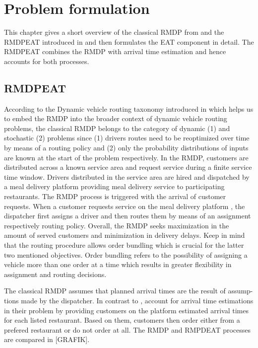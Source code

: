 \chapter{Problem formulation}

This chapter gives a short overview of the classical RMDP from \cite{UlmerRMDP} and the RMDPEAT introduced in \cite{Hildebrandt2020_EAT} and then formulates the EAT component in detail. The RMDPEAT combines the RMDP with arrival time estimation and hence accounts for both processes.

\section{RMDPEAT} 

According to the Dynamic vehicle routing taxonomy introduced in \cite{psaraftis} which helps us to embed the RMDP into the broader context of dynamic vehicle routing problems, the classical RMDP belongs to the category of dynamic (1) and stochastic (2) problems since (1) drivers routes need to be reoptimized over time by means of a routing policy and (2) only the probability distributions of inputs are known at the start of the problem respectively. In the RMDP, customers are distributed across a known service area and request service during a finite service time window. Drivers distributed in the service area are hired and dispatched by a meal delivery platform providing meal delivery service to participating restaurants. The RMDP process is triggered with the arrival of customer requests. When a customer requests service on the meal delivery platform , the dispatcher first assigns a driver and then routes them by means of an assignment respectively routing policy. Overall, the RMDP seeks maximization in the amount of served customers and minimization in delivery delays. Keep in mind that the routing procedure allows order bundling which is crucial for the latter two mentioned objectives. Order bundling refers to the possibility of assigning a vehicle more than one order at a time which results in greater flexibility in assignment and routing decisions.

The classical RMDP assumes that planned arrival times are the result of assump-tions made by the dispatcher. In contrast to \citet{UlmerRMDP}, \citet{Hildebrandt2020_EAT} account for arrival time estimations in their problem by providing customers on the platform estimated arrival times for each listed restaurant. Based on them, customers then order either from a prefered restaurant or do not order at all. The RMDP and RMPDEAT processes are compared in [GRAFIK]. 


